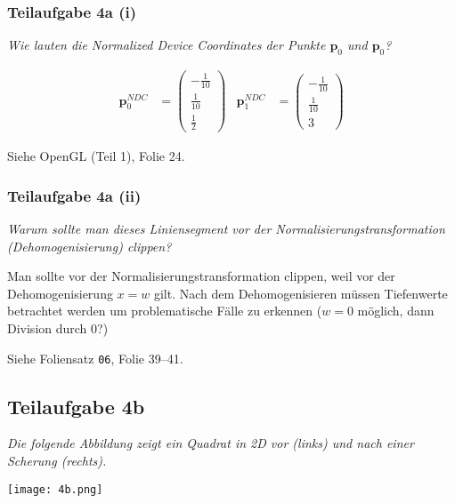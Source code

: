\documentclass[a4paper]{scrartcl}
\begin{document}
\subsubsection*{Teilaufgabe 4a (i)}
\textit{Wie lauten die Normalized Device Coordinates der Punkte $\mathbf{p}_0$
und $\mathbf{p}_0$?}

\begin{align}
    \mathbf{p}_0^{NDC} &= \begin{pmatrix}-\frac{1}{10}\\\frac{1}{10}\\\frac{1}{2}\end{pmatrix} &
    \mathbf{p}_1^{NDC} &= \begin{pmatrix}-\frac{1}{10}\\\frac{1}{10}\\3\end{pmatrix}
\end{align}

Siehe OpenGL (Teil 1), Folie 24.

\subsubsection*{Teilaufgabe 4a (ii)}
\textit{Warum sollte man dieses Liniensegment vor der Normalisierungstransformation
(Dehomogenisierung) clippen?}

Man sollte vor der Normalisierungstransformation clippen, weil vor der
Dehomogenisierung $x=w$ gilt. Nach dem Dehomogenisieren müssen Tiefenwerte
betrachtet werden um problematische Fälle zu erkennen ($w=0$ möglich, dann
Division durch 0?)

Siehe Foliensatz \texttt{06}, Folie 39--41.

\clearpage
\subsection*{Teilaufgabe 4b}
\textit{Die folgende Abbildung zeigt ein Quadrat in 2D vor (links) und nach einer Scherung
(rechts).}

\texttt{[image: 4b.png]}
\end{document}

